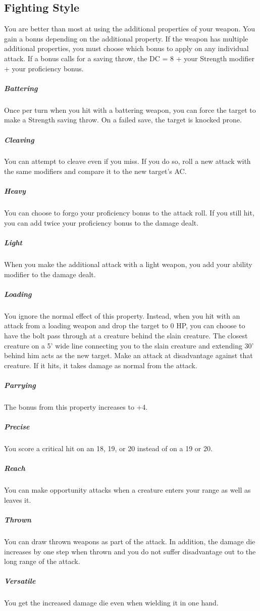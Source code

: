 \subsection{Fighting Style}

You are better than most at using the additional properties of your weapon. You gain a bonus depending on the additional property. If the weapon has multiple additional properties, you must choose which bonus to apply on any individual attack. If a bonus calls for a saving throw, the DC = 8 + your Strength modifier + your proficiency bonus.

\subparagraph*{Battering} Once per turn when you hit with a battering weapon, you can force the target to make a Strength saving throw. On a failed save, the target is knocked prone.

\subparagraph*{Cleaving} You can attempt to cleave even if you miss. If you do so, roll a new attack with the same modifiers and compare it to the new target's AC.

\subparagraph*{Heavy} You can choose to forgo your proficiency bonus to the attack roll. If you still hit, you can add twice your proficiency bonus to the damage dealt.

\subparagraph*{Light} When you make the additional attack with a light weapon, you add your ability modifier to the damage dealt.

\subparagraph*{Loading} You ignore the normal effect of this property. Instead, when you hit with an attack from a loading weapon and drop the target to 0 HP, you can choose to have the bolt pass through at a creature behind the slain creature. The closest creature on a 5' wide line connecting you to the slain creature and extending 30' behind him acts as the new target. Make an attack at disadvantage against that creature. If it hits, it takes damage as normal from the attack.

\subparagraph*{Parrying} The bonus from this property increases to +4.

\subparagraph*{Precise} You score a critical hit on an 18, 19, or 20 instead of on a 19 or 20.

\subparagraph*{Reach} You can make opportunity attacks when a creature enters your range as well as leaves it.

\subparagraph*{Thrown} You can draw thrown weapons as part of the attack. In addition, the damage die increases by one step when thrown and you do not suffer disadvantage out to the long range of the attack.

\subparagraph*{Versatile} You get the increased damage die even when wielding it in one hand.

